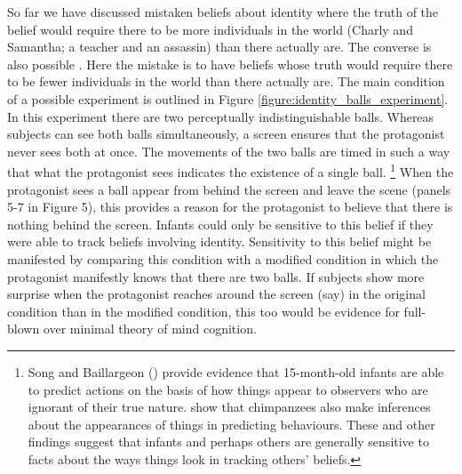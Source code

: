 \documentclass[12pt,\papersize]{extarticle}
\begin{document}
So far we have discussed mistaken beliefs about identity where the truth of the belief would require there to be more individuals in the world (Charly and Samantha; a teacher and an assassin) than there actually are.  The converse is also possible \citep[see, e.g.,][]{en_1794}.  Here the mistake is to have beliefs whose truth would require there to be fewer individuals in the world than there actually are. The main condition of a possible experiment is outlined in Figure \vref{figure:identity_balls_experiment}.  In this experiment there are two perceptually indistinguishable balls.  Whereas subjects can see both balls simultaneously, a screen ensures that the protagonist never sees both at once.  The movements of the two balls are timed in such a way that what the protagonist sees indicates the existence of a single ball.%
\footnote{ 	
Song and Baillargeon (\citeyear[]{en_1823}) provide evidence that 15-month-old infants are able to predict actions on the basis of how things appear to observers who are ignorant of their true nature. \citet{en_1822} show that chimpanzees also make inferences about the appearances of things in predicting behaviours. These and other findings \citep[e.g.][]{en_1820} suggest that infants and perhaps others are generally sensitive to facts about the ways things look in tracking others’ beliefs. 
}
When the protagonist sees a ball appear from behind the screen and leave the scene (panels 5-7 in Figure 5), this provides a reason for the protagonist to believe that there is nothing behind the screen.  Infants could only be sensitive to this belief if they were able to track beliefs involving identity.  Sensitivity to this belief might be manifested by comparing this condition with a modified condition in which the protagonist  manifestly knows that there are two balls.  If subjects show more surprise when the protagonist reaches around the screen (say) in the original condition than in the modified condition, this too would be evidence for full-blown over minimal theory of mind cognition.
\end{document}
